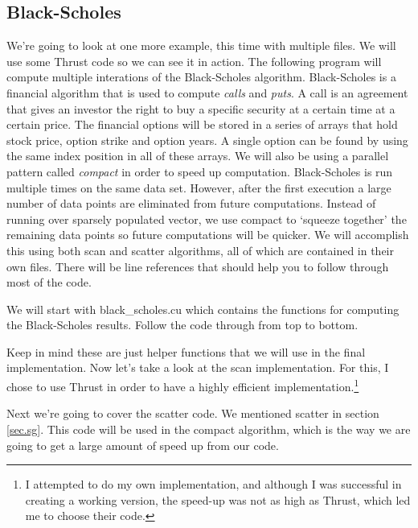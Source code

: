 \documentclass{article}
\newcommand{\comp}[1]{{\ttfamily #1}}
\begin{document}
\subsection{Black-Scholes}
  We're going to look at one more example, this time with multiple files. We will use some Thrust code so we can see it in action. The following program will compute multiple interations of the Black-Scholes algorithm. Black-Scholes is a financial algorithm that is used to compute \emph{calls} and \emph{puts}. A call is an agreement that gives an investor the right to buy a specific security at a certain time at a certain price. The financial options will be stored in a series of arrays that hold stock price, option strike and option years. A single option can be found by using the same index position in all of these arrays. We will also be using a parallel pattern called \emph{compact} in order to speed up computation. Black-Scholes is run multiple times on the same data set. However, after the first execution a large number of data points are eliminated from future computations. Instead of running over sparsely populated vector, we use compact to `squeeze together' the remaining data points so future computations will be quicker. We will accomplish this using both scan and scatter algorithms, all of which are contained in their own files. There will be line references that should help you to follow through most of the code.

  We will start with \comp{black\_scholes.cu} which contains the functions for computing the Black-Scholes results. Follow the code through from top to bottom.

  

  Keep in mind these are just helper functions that we will use in the final implementation. Now let's take a look at the scan implementation. For this, I chose to use Thrust in order to have a highly efficient implementation.\footnote{I attempted to do my own implementation, and although I was successful in creating a working version, the speed-up was not as high as Thrust, which led me to choose their code.}

  

  Next we're going to cover the scatter code. We mentioned scatter in section \ref{sec.sg}. This code will be used in the compact algorithm, which is the way we are going to get a large amount of speed up from our code.

  
\end{document}

